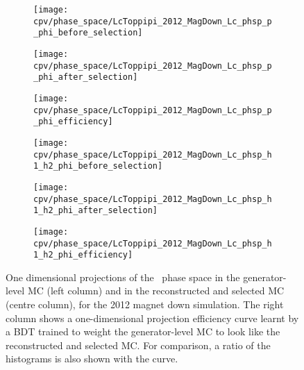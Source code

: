 \begin{figure}
  \begin{subfigure}{0.25\textwidth}
    \texttt{[image: cpv/phase\_space/LcToppipi\_2012\_MagDown\_Lc\_phsp\_p\_phi\_before\_selection]}
    \label{fig:cpv:phsp:effs:ppipi:Lc_phsp_p_phi:before}
  \end{subfigure}
  \begin{subfigure}{0.25\textwidth}
    \texttt{[image: cpv/phase\_space/LcToppipi\_2012\_MagDown\_Lc\_phsp\_p\_phi\_after\_selection]}
    \label{fig:cpv:phsp:effs:ppipi:Lc_phsp_p_phi:after}
  \end{subfigure}
  \begin{subfigure}{0.25\textwidth}
    \texttt{[image: cpv/phase\_space/LcToppipi\_2012\_MagDown\_Lc\_phsp\_p\_phi\_efficiency]}
    \label{fig:cpv:phsp:effs:ppipi:Lc_phsp_p_phi:eff}
  \end{subfigure}

  \begin{subfigure}{0.25\textwidth}
    \texttt{[image: cpv/phase\_space/LcToppipi\_2012\_MagDown\_Lc\_phsp\_h1\_h2\_phi\_before\_selection]}
    \label{fig:cpv:phsp:effs:ppipi:Lc_phsp_h1_h2_phi:before}
  \end{subfigure}
  \begin{subfigure}{0.25\textwidth}
    \texttt{[image: cpv/phase\_space/LcToppipi\_2012\_MagDown\_Lc\_phsp\_h1\_h2\_phi\_after\_selection]}
    \label{fig:cpv:phsp:effs:ppipi:Lc_phsp_h1_h2_phi:after}
  \end{subfigure}
  \begin{subfigure}{0.25\textwidth}
    \texttt{[image: cpv/phase\_space/LcToppipi\_2012\_MagDown\_Lc\_phsp\_h1\_h2\_phi\_efficiency]}
    \label{fig:cpv:phsp:effs:ppipi:Lc_phsp_h1_h2_phi:eff}
  \end{subfigure}

  \caption{%
    One dimensional projections of the \LcToppipi\ phase space in the 
    generator-level \ac{MC} (left column) and in the reconstructed and selected 
    \ac{MC} (centre column), for the 2012 magnet down simulation.
    The right column shows a one-dimensional projection efficiency curve learnt 
    by a \ac{BDT} trained to weight the generator-level \ac{MC} to look like 
    the reconstructed and selected \ac{MC}.
    For comparison, a ratio of the histograms is also shown with the curve.
  }
  \label{fig:cpv:phsp:effs:ppipi}
\end{figure}
